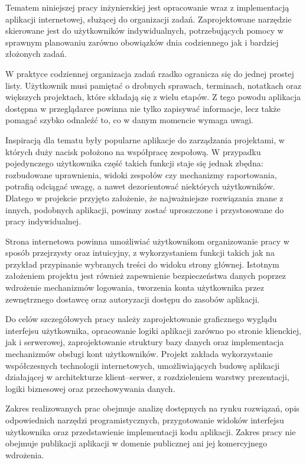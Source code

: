 \documentclass[12pt,a4paper,twoside]{report}
\newcommand{\FirstParagraph}{\noindent\ignorespaces}
\begin{document}
\FirstParagraph Tematem niniejszej pracy inżynierskiej jest opracowanie wraz z implementacją aplikacji internetowej, służącej do organizacji zadań. Zaprojektowane narzędzie skierowane jest do użytkowników indywidualnych, potrzebujących pomocy w sprawnym planowaniu zarówno obowiązków dnia codziennego jak i bardziej złożonych zadań.

W praktyce codziennej organizacja zadań rzadko ogranicza się do jednej prostej listy. Użytkownik musi pamiętać o drobnych sprawach, terminach, notatkach oraz większych projektach, które składają się z wielu etapów. Z tego powodu aplikacja dostępna w przeglądarce powinna nie tylko zapisywać informacje, lecz także pomagać szybko odnaleźć to, co w danym momencie wymaga uwagi.

Inspiracją dla tematu były popularne aplikacje do zarządzania projektami, w których duży nacisk położono na współpracę zespołową. W przypadku pojedynczego użytkownika część takich funkcji staje się jednak zbędna: rozbudowane uprawnienia, widoki zespołów czy mechanizmy raportowania, potrafią odciągać uwagę, a nawet dezorientować niektórych użytkowników. Dlatego w projekcie przyjęto założenie, że najważniejsze rozwiązania znane z innych, podobnych aplikacji, powinny zostać uproszczone i przystosowane do pracy indywidualnej.

Strona internetowa powinna umożliwiać użytkownikom organizowanie pracy w sposób przejrzysty oraz intuicyjny, z wykorzystaniem funkcji takich jak na przykład przypinanie wybranych treści do widoku strony głównej. Istotnym założeniem projektu jest również zapewnienie bezpieczeństwa danych poprzez wdrożenie mechanizmów logowania, tworzenia konta użytkownika przez zewnętrznego dostawcę oraz autoryzacji dostępu do zasobów aplikacji.

Do celów szczegółowych pracy należy zaprojektowanie graficznego wyglądu interfejsu użytkownika, opracowanie logiki aplikacji zarówno po stronie klienckiej, jak i serwerowej, zaprojektowanie struktury bazy danych oraz implementacja mechanizmów obsługi kont użytkowników. Projekt zakłada wykorzystanie współczesnych technologii internetowych, umożliwiających budowę aplikacji działającej w architekturze klient--serwer, z rozdzieleniem warstwy prezentacji, logiki biznesowej oraz przechowywania danych.

Zakres realizowanych prac obejmuje analizę dostępnych na rynku rozwiązań, opis odpowiednich narzędzi programistycznych, przygotowanie widoków interfejsu użytkownika oraz przedstawienie implementacji kodu aplikacji. Zakres pracy nie obejmuje publikacji aplikacji w domenie publicznej ani jej komercyjnego wdrożenia.
\end{document}
